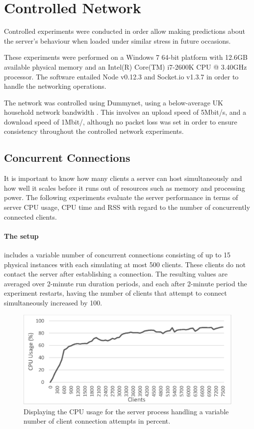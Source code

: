 \documentclass[bsc, 12pt, twoside, singlespacing, parskip, abbrevs, notimes, normalheadings, logo, deptreport]{styles/infthesis}
\begin{document}
\section{Controlled Network}
Controlled experiments were conducted in order allow making predictions about the server's behaviour when loaded under similar stress in future occasions.

These experiments were performed on a Windows 7 64-bit platform with 12.6GB available physical memory and an Intel(R) Core(TM) i7-2600K CPU @ 3.40GHz processor. The software entailed Node v0.12.3 and Socket.io v1.3.7 in order to handle the networking operations.

The network was controlled using Dummynet, using a below-average UK household network bandwidth \cite{household_bandwidth}. This involves an upload speed of 5Mbit/s, and a download speed of 1Mbit/, although no packet loss was set in order to ensure consistency throughout the controlled network experiments.

\subsection{Concurrent Connections}
It is important to know how many clients a server can host simultaneously and how well it scales before it runs out of resources such as memory and processing power. The following experiments evaluate the server performance in terms of server CPU usage, CPU time and RSS with regard to the number of concurrently connected clients.

\paragraph*{The setup} includes a variable number of concurrent connections consisting of up to 15 physical instances with each simulating at most 500 clients. These clients  do not contact the server after establishing a connection. The resulting values are averaged over 2-minute run duration periods, and each after 2-minute period the experiment restarts, having the number of clients that attempt to connect simultaneously increased by 100.

\begin{figure}[H]
\centering
\includegraphics[scale=0.9]{images/test_CLIENT_CPUusage.eps}
\caption{Displaying the CPU usage for the server process handling a variable number of client connection attempts in percent.}
\label{fig:cpu_usage}
\vspace{1em}
\end{figure}
\end{document}
